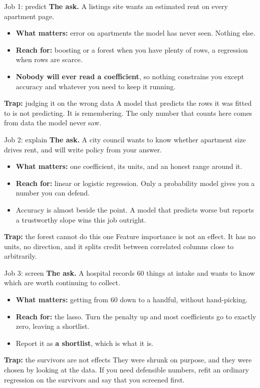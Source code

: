 \documentclass[aspectratio=169]{beamer}
\newenvironment{trap}[1]{\begin{alertblock}{\textbf{Trap:} #1}}{\end{alertblock}}
\begin{document}
\begin{frame}{Job 1: predict}
\textbf{The ask.} A listings site wants an estimated rent on every apartment page.
\begin{itemize}
  \item \textbf{What matters:} error on apartments the model has never seen. Nothing else.
  \item \textbf{Reach for:} boosting or a forest when you have plenty of rows, a regression when
        rows are scarce.
  \item \textbf{Nobody will ever read a coefficient}, so nothing constrains you except accuracy
        and whatever you need to keep it running.
\end{itemize}
\begin{trap}{judging it on the wrong data}
A model that predicts the rows it was fitted to is not predicting. It is remembering. The only
number that counts here comes from data the model never saw.
\end{trap}
\end{frame}

\begin{frame}{Job 2: explain}
\textbf{The ask.} A city council wants to know whether apartment size drives rent, and will write
policy from your answer.
\begin{itemize}
  \item \textbf{What matters:} one coefficient, its units, and an honest range around it.
  \item \textbf{Reach for:} linear or logistic regression. Only a probability model gives you a
        number you can defend.
  \item Accuracy is almost beside the point. A model that predicts worse but reports a
        trustworthy slope wins this job outright.
\end{itemize}
\begin{trap}{the forest cannot do this one}
Feature importance is not an effect. It has no units, no direction, and it splits credit between
correlated columns close to arbitrarily.
\end{trap}
\end{frame}

\begin{frame}{Job 3: screen}
\textbf{The ask.} A hospital records 60 things at intake and wants to know which are worth
continuing to collect.
\begin{itemize}
  \item \textbf{What matters:} getting from 60 down to a handful, without hand-picking.
  \item \textbf{Reach for:} the lasso. Turn the penalty up and most coefficients go to exactly
        zero, leaving a shortlist.
  \item Report it as \textbf{a shortlist}, which is what it is.
\end{itemize}
\begin{trap}{the survivors are not effects}
They were shrunk on purpose, and they were chosen by looking at the data. If you need defensible
numbers, refit an ordinary regression on the survivors and say that you screened first.
\end{trap}
\end{frame}
\end{document}
